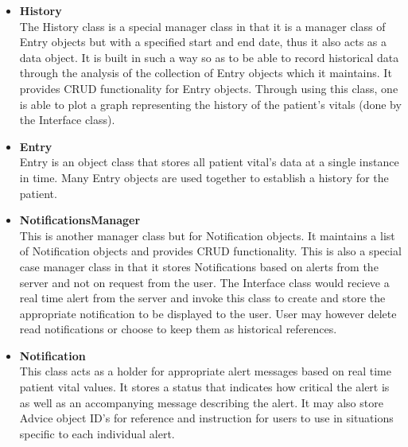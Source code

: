 \begin{itemize}
  	\item \textbf{History}\\
	The History class is a special manager class in that it is a manager class of Entry objects but with a specified start and end date, thus it also acts as a data object. It is built in such a way so as to be able to record historical data through the analysis of the collection of Entry objects which it maintains. It provides CRUD functionality for Entry objects. Through using this class, one is able to plot a graph representing the history of the patient's vitals (done by the Interface class). 
  	\item \textbf{Entry}\\
	Entry is an object class that stores all patient vital's data at a single instance in time. Many Entry objects are used together to establish a history for the patient. 
  	\item \textbf{NotificationsManager}\\
	This is another manager class but for Notification objects. It maintains a list of Notification objects and provides CRUD functionality. This is also a special case manager class in that it stores Notifications based on alerts from the server and not on request from the user. The Interface class would recieve a real time alert from the server and invoke this class to create and store the appropriate notification to be displayed to the user. User may however delete read notifications or choose to keep them as historical references. 
  	\item \textbf{Notification}\\
	This class acts as a holder for appropriate alert messages based on real time patient vital values. It stores a status that indicates how critical the alert is as well as an accompanying message describing the alert. It may also store Advice object ID's for reference and instruction for users to use in situations specific to each individual alert.
\end{itemize}
